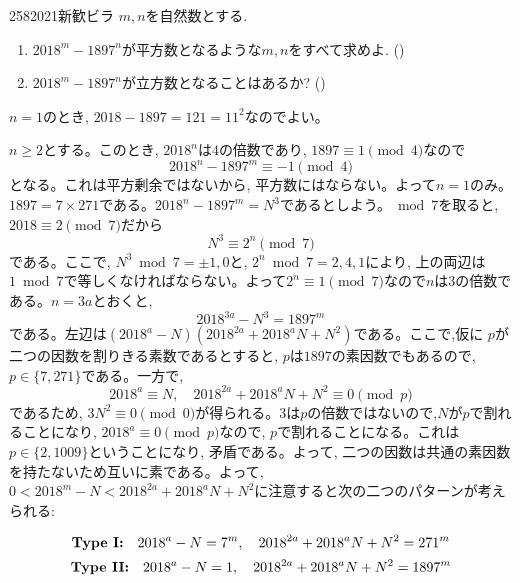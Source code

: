 \begin{thm}{258}{}{2021新歓ビラ}
$m,n$を自然数とする. 
\begin{enumerate}
\item $2018^{m} - 1897^{n}$が平方数となるような$m,n$をすべて求めよ. ()
\item $2018^{m} - 1897^{n}$が立方数となることはあるか? ()
\end{enumerate}
\end{thm}

$n=1$のとき, $2018 - 1897 = 121 = 11^2$なのでよい。\par 
$n\geq 2$とする。このとき, $2018^{n}$は$4$の倍数であり, $1897\equiv 1\pmod{4}$なので
\[2018^{n} - 1897^{m} \equiv -1\pmod{4}\]
となる。これは平方剰余ではないから, 平方数にはならない。よって$n=1$のみ。\\
$1897 = 7\times 271$である。$2018^{n} - 1897^{m} = N^3$であるとしよう。$\bmod{7}$を取ると, $2018 \equiv 2\pmod{7}$だから
\[N^3 \equiv 2^{n}\pmod{7}\]
である。ここで, $N^3\bmod{7}  = \pm 1, 0$と, $2^{n} \bmod{7} = 2,4,1$により, 上の両辺は$1\bmod{7}$で等しくなければならない。よって$2^{n} \equiv  1\pmod{7}$なので$n$は$3$の倍数である。$n=3a$とおくと, 
\[2018^{3a} - N^3 = 1897^{m}\]
である。左辺は$(2018^a - N)(2018^{2a} + 2018^{a}N + N^2)$である。ここで,仮に $p$が二つの因数を割りきる素数であるとすると, $p$は$1897$の素因数でもあるので, $p\in \{ 7,271\}$である。一方で, 
\[2018^{a} \equiv N,\quad 2018^{2a} + 2018^{a}N + N^2 \equiv 0\pmod{p}\]
であるため, $3N^2 \equiv 0\pmod{0}$が得られる。$3$は$p$の倍数ではないので,$N$が$p$で割れることになり, $2018^{a} \equiv 0\pmod{p}$なので, $p$で割れることになる。これは$p\in \{ 2,1009 \}$ということになり, 矛盾である。よって, 二つの因数は共通の素因数を持たないため互いに素である。よって, $0 < 2018^{m} - N < 2018^{2a} + 2018^{a}N + N^2$に注意すると次の二つのパターンが考えられる:
\begin{screen} 
\[\text{\textbf{Type I:}}\quad 2018^{a} - N = 7^{m},\quad 2018^{2a} + 2018^{a}N + N^2 = 271^{m}\]
\[\text{\textbf{Type II:}}\quad 2018^{a} - N = 1,\quad 2018^{2a} + 2018^{a}N + N^2 = 1897^{m}\]
\end{screen}
